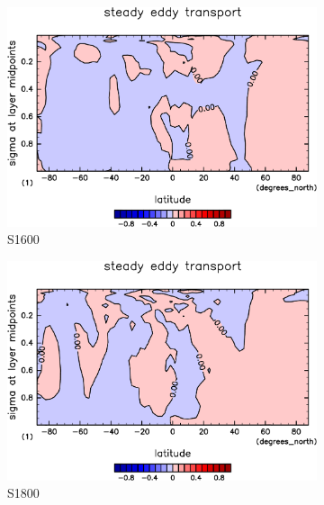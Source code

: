 \documentclass[body]{subfiles}
\begin{document}
\begin{figure}[t]
\begin{subfigure}{.4\textwidth}
		\includegraphics[width=\textwidth]{S1600/MeriHeatTransTest@dryStatEn_SE,time=3650:4015-crop-rotate.pdf}
		\caption{S1600}\label{乾燥静的エネルギー停滞性擾乱S1600}
	\end{subfigure}
	\begin{subfigure}{.4\textwidth}
		\centering
		\includegraphics[width=\textwidth]{S1800/MeriHeatTransTest@dryStatEn_SE,time=3650:4015-crop-rotate.pdf}
		\caption{S1800}\label{乾燥静的エネルギー停滞性擾乱S1800}
	\end{subfigure}
	\begin{subfigure}{.4\textwidth}
		\centering

\end{subfigure}
\end{figure}
\end{document}
